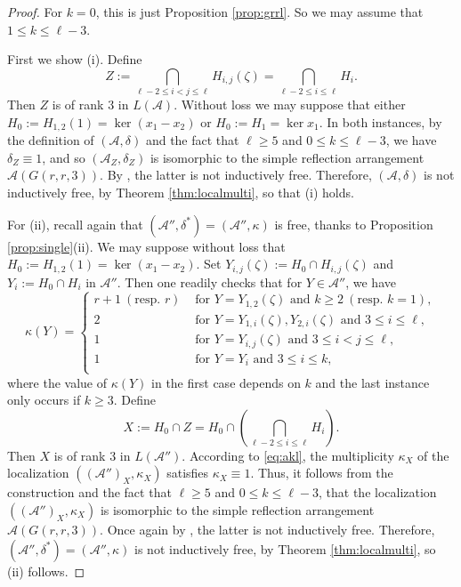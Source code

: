 \begin{proof}
For $k = 0$, this is just Proposition \ref{prop:grrl}. 
So we may assume that $1 \le k \le \ell-3$.

First we show (i). Define 
\[
Z := \bigcap_{\ell-2 \le i < j \le \ell}{H_{i,j}(\zeta)}
= \bigcap_{\ell-2 \le i \le \ell} H_i.
\]
Then $Z$ is of rank $3$ in $L({{\mathcal A}})$.
Without loss 
we may suppose that either
$H_0 := H_{1,2}(1) = \ker(x_1 - x_2)$
or 
$H_0 := H_1 = \ker x_1$.
In both instances, 
by the definition of $({{\mathcal A}}, \delta)$
and the fact that
$\ell \ge 5$
and $0 \le k \le \ell-3$,
we have $\delta_Z \equiv 1$, and so 
$({{\mathcal A}}_Z, \delta_Z)$ is isomorphic to the simple 
reflection arrangement ${{\mathcal A}}(G(r,r,3))$.
By \cite[Prop.\ 3.2]{hogeroehrle:indfree}, 
the latter is not inductively free.
Therefore, $({{\mathcal A}}, \delta)$
is not inductively free, by
Theorem \ref{thm:localmulti}, so that (i) holds.

For (ii), recall again that
$({{\mathcal A}}'', \delta^*) =  ({{\mathcal A}}'', \kappa)$ is free, 
thanks to Proposition \ref{prop:single}(ii).
We may suppose without loss that 
$H_0 := H_{1,2}(1) = \ker(x_1 - x_2)$.
Set $Y_{i,j}(\zeta) := H_0 \cap H_{i,j}(\zeta)$ and 
$Y_i  := H_0 \cap H_i$ in ${{\mathcal A}}''$.
Then one readily checks that for $Y \in {{\mathcal A}}''$, we have
\begin{equation}
\label{eq:akl}
\kappa(Y) = 
\begin{cases}
r+1\  (\text{resp. } r) & \text{ for } Y = Y_{1,2}(\zeta) 
\text{ and } k \ge 2\  (\text{resp. }  k = 1),\\
2   & \text{ for } Y = Y_{1,i}(\zeta), Y_{2,i}(\zeta) \text{ and } 3 \le i \le \ell,\\
1   & \text{ for } Y = Y_{i,j}(\zeta) \text{ and }  3 \le i < j \le \ell,\\
1   & \text{ for } Y = Y_i \text{ and }  3 \le i \le k,\\
\end{cases}
\end{equation}
where the value of $\kappa(Y)$ in the first case depends on $k$ and 
the last instance only occurs if $k \ge 3$. 
Define 
\[
X := H_0 \cap Z = H_0 \cap \left(\bigcap_{\ell-2 \le i \le \ell} H_i\right).
\]
Then $X$ is of rank $3$ in $L({{\mathcal A}}'')$.
According to \eqref{eq:akl}, the multiplicity 
$\kappa_X$ of the localization  
$\left( ({{\mathcal A}}'')_X, \kappa_X\right)$ satisfies $\kappa_X \equiv 1$.
Thus, it follows from the construction 
and the fact that $\ell \ge 5$
and $0 \le k \le \ell-3$, that the localization 
$(({{\mathcal A}}'')_X, \kappa_X)$ is isomorphic to the simple 
reflection arrangement ${{\mathcal A}}(G(r,r,3))$.
Once again by \cite[Prop.\ 3.2]{hogeroehrle:indfree}, 
the latter is not inductively free.
Therefore, $({{\mathcal A}}'', \delta^*) =  ({{\mathcal A}}'', \kappa)$
is not inductively free, by
Theorem \ref{thm:localmulti}, so (ii) follows.
\end{proof}

